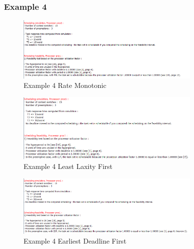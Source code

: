 \documentclass{article}
\begin{document}
\subsubsection*{Example 4}
\begin{figure}[H]
    \centering
    \includegraphics[width=0.8\textwidth]{4_RM.png}
    \caption{Example 4 Rate Monotonic}
\end{figure}
\begin{figure}[H]
    \centering
    \includegraphics[width=0.8\textwidth]{4_LLF.png}
    \caption{Example 4 Least Laxity First}
\end{figure}
\begin{figure}[H]
    \centering
    \includegraphics[width=0.8\textwidth]{4_EDF.png}
    \caption{Example 4 Earliest Deadline First}
\end{figure}
\end{document}
